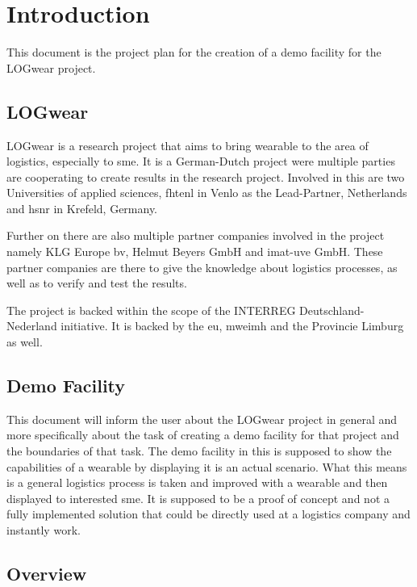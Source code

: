 \chapter{Introduction}
This document is the project plan for the creation of a demo facility for the LOGwear project.

\section{LOGwear}
LOGwear is a research project that aims to bring wearable to the area of logistics, especially to \gls{sme}. It is a German-Dutch project were multiple parties are cooperating to create results in the research project. Involved in this are two Universities of applied sciences, \gls{fhtenl} in Venlo as the Lead-Partner, Netherlands and \gls{hsnr} in Krefeld, Germany.

Further on there are also multiple partner companies involved in the project namely KLG Europe bv, Helmut Beyers GmbH and imat-uve GmbH. These partner companies are there to give the knowledge about logistics processes, as well as to verify and test the results.

The project is backed within the scope of the INTERREG Deutschland-Nederland initiative. It is backed by the \gls{eu}, \gls{mweimh} and the Provincie Limburg as well.

\section{Demo Facility}




This document will inform the user about the LOGwear project in general and more specifically about the task of creating a demo facility for that project and the boundaries of that task.  The demo facility in this is supposed to show the capabilities of a wearable by displaying it is an actual scenario. What this means is a general logistics process is taken and improved with a wearable and then displayed to interested \gls{sme}. It is supposed to be a proof of concept and not a fully implemented solution that could be directly used at a logistics company and instantly work.

\section{Overview}